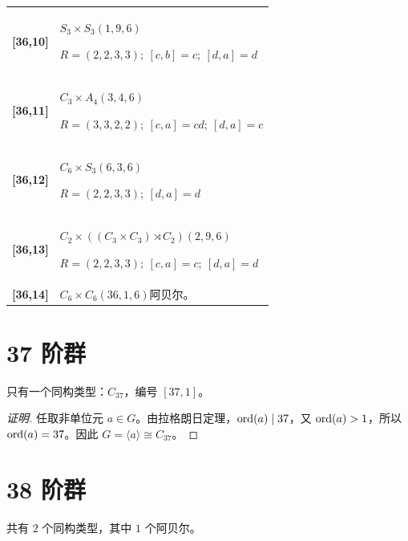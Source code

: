 \documentclass[UTF8,fontset=fandol,11pt,a4paper]{ctexart}
\begin{document}
\begin{longtable}{@{}p{17mm}>{\raggedright\arraybackslash}p{141mm}@{}}
\textbf{[36,10]} & $S_{3}\times S_{3}$\quad $(1,9,6)$\par\(R=(2,2,3,3);\allowbreak\ [c,b]=c;\allowbreak\ [d,a]=d\)\\[3pt]

\textbf{[36,11]} & $C_{3}\times A_{4}$\quad $(3,4,6)$\par\(R=(3,3,2,2);\allowbreak\ [c,a]=cd;\allowbreak\ [d,a]=c\)\\[3pt]

\textbf{[36,12]} & $C_{6}\times S_{3}$\quad $(6,3,6)$\par\(R=(2,2,3,3);\allowbreak\ [d,a]=d\)\\[3pt]

\textbf{[36,13]} & $C_{2}\times ((C_{3}\times C_{3})\rtimes C_{2})$\quad $(2,9,6)$\par\(R=(2,2,3,3);\allowbreak\ [c,a]=c;\allowbreak\ [d,a]=d\)\\[3pt]

\textbf{[36,14]} & $C_{6}\times C_{6}$\quad $(36,1,6)$\quad 阿贝尔。\\[3pt]

\end{longtable}\endgroup

\section*{37 阶群}\label{order:37}

只有一个同构类型：$C_{37}$，编号 $[37,1]$。

\begin{proof}[证明]
任取非单位元 $a\in G$。由拉格朗日定理，$\operatorname{ord}(a)\mid 37$，又 $\operatorname{ord}(a)>1$，所以 $\operatorname{ord}(a)=37$。因此 $G=\langle a\rangle\cong C_{37}$。
\end{proof}

\section*{38 阶群}\label{order:38}

共有 $2$ 个同构类型，其中 $1$ 个阿贝尔。

\begingroup\small\setlength{\tabcolsep}{3pt}\renewcommand{\arraystretch}{1.12}
\end{document}
